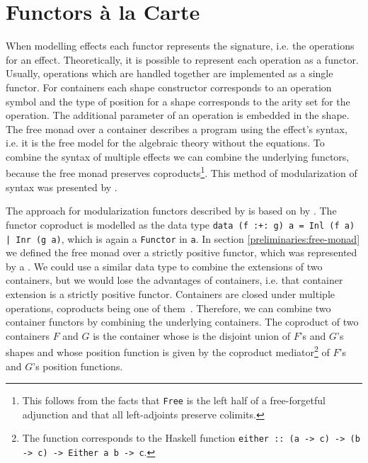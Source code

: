 \section{Functors {\`{a}} la Carte}
\label{first-order:functor}

When modelling effects each functor represents the signature, i.e. the operations for
an effect.
Theoretically, it is possible to represent each operation as a functor.
Usually, operations which are handled together are implemented as a single functor.
For containers each shape constructor corresponds to an operation symbol and the
type of position for a shape corresponds to the arity set for the operation.
The additional parameter of an operation is embedded in the shape.
The free monad over a container describes a program using the effect's syntax,
i.e. it is the free model for the algebraic theory without the equations.
To combine the syntax of multiple effects we can combine the underlying
functors, because the free monad preserves coproducts\footnote{This follows from
the facts that \texttt{Free} is the left half of a free-forgetful adjunction and
that all left-adjoints preserve colimits.}.
This method of modularization of syntax was presented by
\textcite{DBLP:journals/jfp/Swierstra08}.

The approach for modularization functors described by
\textcite{DBLP:conf/haskell/WuSH14} is based on
 by
\textcite{DBLP:journals/jfp/Swierstra08}.
The functor coproduct is modelled as the data type
\texttt{data (f :+: g) a = Inl (f a) | Inr (g a)},
which is again a \texttt{Functor} in \texttt{a}.
In section \ref{preliminaries:free-monad} we defined the free monad over
a strictly positive functor, which was represented by a
.
We could use a similar data type to combine the extensions of two containers,
but we would lose the advantages of containers, i.e. that container extension is
a strictly positive functor.
Containers are closed under multiple operations, coproducts being one of
them~\cite{DBLP:conf/fossacs/AbbottAG03}.
Therefore, we can combine two container functors by combining the underlying
containers.
The coproduct of two containers $F$ and $G$ is the container whose
 is the disjoint union of $F$'s and $G$'s shapes and whose
position function  is given by the coproduct
mediator\footnote{The function \AgdaFunction{[\_,\_]} corresponds to the Haskell
function \texttt{either :: (a -> c) -> (b -> c) -> Either a b ->
c}.} of $F$'s and $G$'s position functions.

